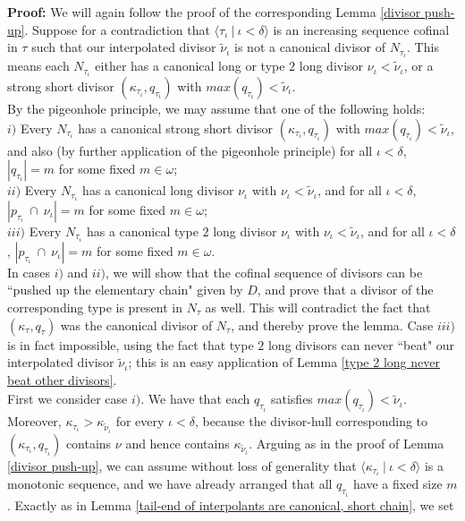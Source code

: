\documentclass[12pt]{article}
\begin{document}
\textbf{Proof:} We will again follow the proof of the corresponding Lemma \ref{divisor push-up}.  Suppose for a contradiction that $\langle \tau_\iota \ | \ \iota < \delta \rangle$ is an increasing sequence cofinal in $\tau$ such that our interpolated divisor $\tilde{\nu}_\iota$ is not a canonical divisor of $N_{\tau_\iota}$.  This means each $N_{\tau_\iota}$ either has a canonical long or type $2$ long divisor $\nu_\iota < \tilde{\nu}_\iota$, or a strong short divisor $( \kappa_{\tau_\iota} , q_{\tau_\iota})$ with $max (q_{\tau_\iota}) < \tilde{\nu}_\iota$.\\


By the pigeonhole principle, we may assume that one of the following holds:\\




$i)$ Every $N_{\tau_\iota}$ has a canonical strong short divisor $(\kappa_{\tau_\iota} , q_{\tau_\iota} )$ with $max (q_{\tau_\iota}) < \tilde{\nu}_\iota$, and also (by further application of the pigeonhole principle) for all $\iota < \delta$, $|q_{\tau_\iota}| = m$ for some fixed $m \in \omega$;\\

$ii)$ Every $N_{\tau_\iota}$ has a canonical long divisor $\nu_\iota$ with $\nu_\iota < \tilde{\nu}_\iota$, and for all $\iota < \delta$, $|p_{\tau_\iota} \ \cap \ \nu_\iota| = m$ for some fixed $m \in \omega$;\\

$iii)$ Every $N_{\tau_\iota}$ has a canonical type $2$ long divisor $\nu_\iota$ with $\nu_\iota < \tilde{\nu}_\iota$, and for all $\iota < \delta$, $|p_{\tau_\iota} \ \cap \ \nu_\iota| = m$ for some fixed $m \in \omega$.\\

In cases $i)$ and $ii)$, we will show that the cofinal sequence of divisors can be ``pushed up the elementary chain" given by $D$, and prove that a divisor of the corresponding type is present in $N_\tau$ as well.  This will contradict the fact that $(\kappa_\tau , q_\tau)$ was the canonical divisor of $N_\tau$, and thereby prove the lemma.  Case $iii)$ is in fact impossible, using the fact that type $2$ long divisors can never ``beat" our interpolated divisor $\tilde{\nu}_\iota$; this is an easy application of Lemma \ref{type 2 long never beat other divisors}.\\





 First we consider case $i)$.  We have that each $q_{\tau_\iota}$ satisfies $max (q_{\tau_\iota}) < \tilde{\nu}_\iota$.  Moreover, $\kappa_{\tau_\iota} > \kappa_{\tilde{\nu}_\iota}$ for every $\iota < \delta$, because the divisor-hull corresponding to $(\kappa_{\tau_\iota} , q_{\tau_\iota} )$ contains $\nu$ and hence contains $\kappa_{\tilde{\nu}_\iota}$.  Arguing as in the proof of Lemma \ref{divisor push-up}, we can assume without loss of generality that $\langle \kappa_{\tau_\iota} \ | \ \iota < \delta \rangle$ is a monotonic sequence, and we have already arranged that all $q_{\tau_\iota}$ have a fixed size $m$.  Exactly as in Lemma \ref{tail-end of interpolants are canonical, short chain}, we set
\end{document}
